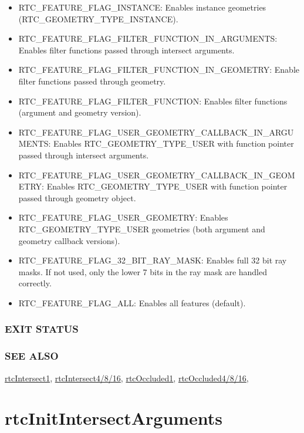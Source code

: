 \begin{itemize}
\item
  RTC\_FEATURE\_FLAG\_INSTANCE: Enables instance geometries
  (RTC\_GEOMETRY\_TYPE\_INSTANCE).
\item
  RTC\_FEATURE\_FLAG\_FILTER\_FUNCTION\_IN\_ARGUMENTS: Enables filter
  functions passed through intersect arguments.
\item
  RTC\_FEATURE\_FLAG\_FILTER\_FUNCTION\_IN\_GEOMETRY: Enable filter
  functions passed through geometry.
\item
  RTC\_FEATURE\_FLAG\_FILTER\_FUNCTION: Enables filter functions
  (argument and geometry version).
\item
  RTC\_FEATURE\_FLAG\_USER\_GEOMETRY\_CALLBACK\_IN\_ARGUMENTS: Enables
  RTC\_GEOMETRY\_TYPE\_USER with function pointer passed through
  intersect arguments.
\item
  RTC\_FEATURE\_FLAG\_USER\_GEOMETRY\_CALLBACK\_IN\_GEOMETRY: Enables
  RTC\_GEOMETRY\_TYPE\_USER with function pointer passed through
  geometry object.
\item
  RTC\_FEATURE\_FLAG\_USER\_GEOMETRY: Enables RTC\_GEOMETRY\_TYPE\_USER
  geometries (both argument and geometry callback versions).
\item
  RTC\_FEATURE\_FLAG\_32\_BIT\_RAY\_MASK: Enables full 32 bit ray masks.
  If not used, only the lower 7 bits in the ray mask are handled
  correctly.
\item
  RTC\_FEATURE\_FLAG\_ALL: Enables all features (default).
\end{itemize}

\subsubsection{EXIT STATUS}\label{exit-status}

\subsubsection{SEE ALSO}\label{see-also}

\hyperref[rtcintersect1]{rtcIntersect1},
\hyperref[rtcintersect4816]{rtcIntersect4/8/16},
\hyperref[rtcoccluded1]{rtcOccluded1},
\hyperref[rtcoccluded4816]{rtcOccluded4/8/16},

\pagebreak

\section{rtcInitIntersectArguments}\label{rtcinitintersectarguments}

